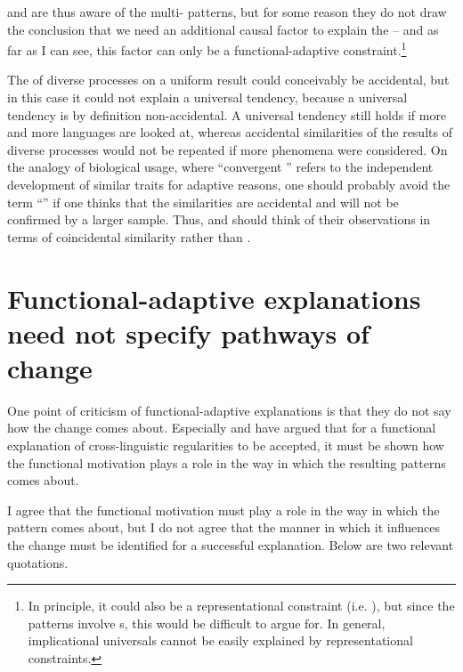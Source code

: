 \documentclass[output=paper]{langsci/langscibook}
\begin{document}
\noindent {} and  are thus aware of the multi- patterns, but for some reason they do not draw the conclusion that we need an additional causal factor to explain the  – and as far as I can see, this factor can only be a functional-adaptive constraint.\footnote{In principle, it could also be a representational constraint (i.e. ), but since the patterns involve s, this would be difficult to argue for. In general, implicational universals cannot be easily explained by representational constraints.}

The  of diverse processes on a uniform result could conceivably be accidental, but in this case it could not explain a universal tendency, because a universal tendency is by definition non-accidental. A universal tendency still holds if more and more languages are looked at, whereas accidental similarities of the results of diverse processes would not be repeated if more phenomena were considered. On the analogy of biological usage, where “convergent ” refers to the independent development of similar traits for adaptive reasons, one should probably avoid the term “” if one thinks that the similarities are accidental and will not be confirmed by a larger sample. Thus,  and  should think of their observations in terms of coincidental similarity rather than .

\section{Functional-adaptive explanations need not specify pathways of change}\label{sec:haspelmath:6}

One point of criticism of functional-adaptive explanations is that they do not say how the change comes about. Especially  and  have argued that for a functional explanation of cross-linguistic regularities to be accepted, it must be shown how the functional motivation plays a role in the way in which the resulting patterns comes about.

I agree that the functional motivation must play a role in the way in which the pattern comes about, but I do not agree that the manner in which it influences the change must be identified for a successful explanation. Below are two relevant quotations.
\end{document}
